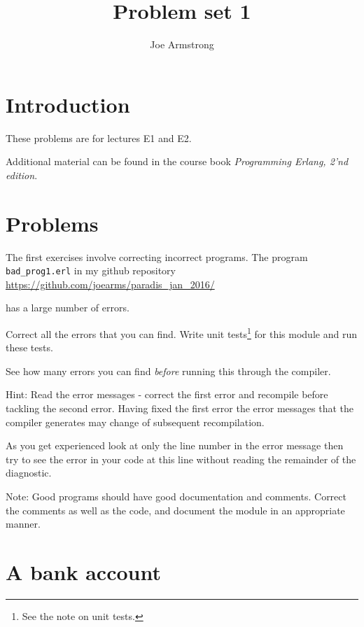 \documentclass[12pt]{hitec}
\title{Problem set 1}
\author{Joe Armstrong}
\begin{document}
\maketitle

\tableofcontents

\section{Introduction}
These problems are for lectures E1 and E2.

Additional material can be found in the course book
{\sl Programming Erlang, 2'nd edition}.

\section{Problems}

The first exercises involve correcting
incorrect programs. The program \verb+bad_prog1.erl+ in my github repository
\newline
\href{https://github.com/joearms/paradis\_jan\_2016/blob/master/lectures/bad\_prog1.erl}
     {https://github.com/joearms/paradis\_jan\_2016/}

has a 
large number of errors.


Correct all the errors that you can find.  Write unit
tests\footnote{See the note on unit tests.}  for this module and run
these tests.

See how many errors you can find {\sl before} running this through the
compiler.

Hint: Read the error messages - correct the first error and recompile
before tackling the second error. Having fixed the first error the
error messages that the compiler generates may change of subsequent
recompilation.

As you get experienced look at only the line number in the error
message then try to see the error in your code at this line without
reading the remainder of the diagnostic.

Note: Good programs should have good documentation and
comments. Correct the comments as well as the code, and document the
module in an appropriate manner.



\section{A bank account}
\end{document}
